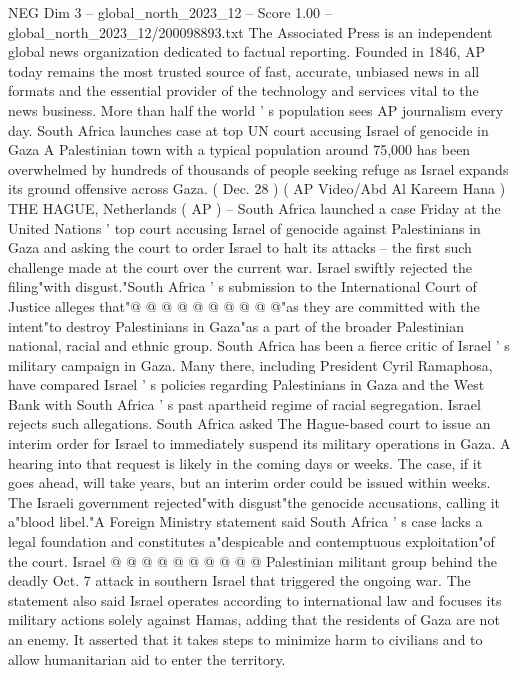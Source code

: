 \begin{textsample}{NEG Dim 3 – global\_north\_2023\_12 – Score 1.00 – global\_north\_2023\_12/200098893.txt}  \label{ex:f3_neg_193}
The Associated Press is an independent global news organization dedicated to factual reporting.
Founded in 1846, AP today remains the most trusted source of fast, accurate, unbiased news in all formats and the essential provider of the technology and services vital to the news business.
More than half the world ' s population sees AP journalism every day.
South Africa launches case at top UN court accusing Israel of genocide in Gaza A Palestinian town with a typical population around 75,000 has been overwhelmed by hundreds of thousands of people seeking refuge as Israel expands its ground offensive across Gaza. ( Dec. 28 ) ( AP Video/Abd Al Kareem Hana ) THE HAGUE, Netherlands ( AP ) -- South Africa launched a case Friday at the United Nations ' top court accusing Israel of genocide against Palestinians in Gaza and asking the court to order Israel to halt its attacks -- the first such challenge made at the court over the current war.
Israel swiftly rejected the filing"with disgust."South Africa ' s submission to the International Court of Justice alleges that"@ @ @ @ @ @ @ @ @ @"as they are committed with the intent"to destroy Palestinians in Gaza"as a part of the broader Palestinian national, racial and ethnic group.
South Africa has been a fierce critic of Israel ' s military campaign in Gaza.
Many there, including President Cyril Ramaphosa, have compared Israel ' s policies regarding Palestinians in Gaza and the West Bank with South Africa ' s past apartheid regime of racial segregation.
Israel rejects such allegations.
South Africa asked The Hague-based court to issue an interim order for Israel to immediately suspend its military operations in Gaza.
A hearing into that request is likely in the coming days or weeks.
The case, if it goes ahead, will take years, but an interim order could be issued within weeks.
The Israeli government rejected"with disgust"the genocide accusations, calling it a"blood libel."A Foreign Ministry statement said South Africa ' s case lacks a legal foundation and constitutes a"despicable and contemptuous exploitation"of the court.
Israel @ @ @ @ @ @ @ @ @ @ Palestinian militant group behind the deadly Oct. 7 attack in southern Israel that triggered the ongoing war.
The statement also said Israel operates according to international law and focuses its military actions solely against Hamas, adding that the residents of Gaza are not an enemy.
It asserted that it takes steps to minimize harm to civilians and to allow humanitarian aid to enter the territory.

\end{textsample}
